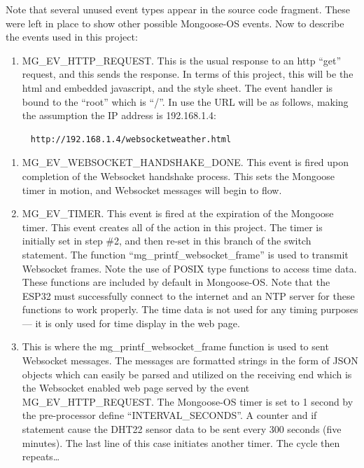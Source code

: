 \documentclass[oneside,letterpaper,12pt]{book}
\providecommand{\tightlist}{%
  \setlength{\itemsep}{0pt}\setlength{\parskip}{0pt}}
\begin{document}
Note that several unused event types appear in the source code fragment.
These were left in place to show other possible Mongoose-OS events. Now
to describe the events used in this project:

\begin{enumerate}
\def\labelenumi{\arabic{enumi}.}
\tightlist
\item
  MG\_EV\_HTTP\_REQUEST. This is the usual response to an http ``get''
  request, and this sends the response. In terms of this project, this
  will be the html and embedded javascript, and the style sheet. The
  event handler is bound to the ``root'' which is ``/''. In use the URL
  will be as follows, making the assumption the IP address is
  192.168.1.4:
\end{enumerate}

\begin{verbatim}
     http://192.168.1.4/websocketweather.html
\end{verbatim}

\begin{enumerate}
\def\labelenumi{\arabic{enumi}.}
\setcounter{enumi}{1}
\tightlist
\item
  MG\_EV\_WEBSOCKET\_HANDSHAKE\_DONE. This event is fired upon
  completion of the Websocket handshake process. This sets the Mongoose
  timer in motion, and Websocket messages will begin to flow.
\item
  MG\_EV\_TIMER. This event is fired at the expiration of the Mongoose
  timer. This event creates all of the action in this project. The timer
  is initially set in step \#2, and then re-set in this branch of the
  switch statement. The function ``mg\_printf\_websocket\_frame'' is
  used to transmit Websocket frames. Note the use of POSIX type
  functions to access time data. These functions are included by default
  in Mongoose-OS. Note that the ESP32 must successfully connect to the
  internet and an NTP server for these functions to work properly. The
  time data is not used for any timing purposes--- it is only used for
  time display in the web page.
\item
  This is where the mg\_printf\_websocket\_frame function is used to
  sent Websocket messages. The messages are formatted strings in the
  form of JSON objects which can easily be parsed and utilized on the
  receiving end which is the Websocket enabled web page served by the
  event MG\_EV\_HTTP\_REQUEST. The Mongoose-OS timer is set to 1 second
  by the pre-processor define ``INTERVAL\_SECONDS''. A counter and if
  statement cause the DHT22 sensor data to be sent every 300 seconds
  (five minutes). The last line of this case initiates another timer.
  The cycle then repeats\ldots{}
\end{enumerate}
\end{document}
